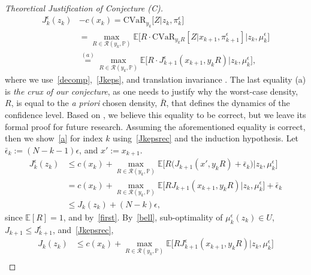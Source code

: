 \documentclass[letterpaper, 10 pt, conference]{ieeeconf}  %
\begin{document}
\begin{proof}[Theoretical Justification of Conjecture (C)]
%
\begin{equation*}\begin{aligned}
J_k^\epsilon(z_k)& - c(x_k) = \text{CVaR}_{y_k}\big[ Z \big| z_k, \pi_k^\epsilon \big]\\
& = {\underset{R \in \mathcal{R}(y_k, \mathbb{P})}\max}\mathbb{E}\big[ R\cdot \text{CVaR}_{y_k R}[ Z | x_{k+1}, \pi^\epsilon_{k+1} ] \big| z_k, \mu_k^\epsilon \big] \\
& {\overset{(a)}{=}} {\underset{R \in \mathcal{R}(y_k, \mathbb{P})}\max}\mathbb{E}\big[ R\cdot J_{k+1}^\epsilon(x_{k+1},y_k R) \big| z_k, \mu_k^\epsilon \big],
\end{aligned}\end{equation*}
%
where we use~\eqref{decomp},~\eqref{Jkeps}, and translation invariance\footnotemark 
{}. 
The last equality (a) is {\em the crux of our conjecture}, 
as one needs to justify why the worst-case density, $R$, is equal to the \textit{a priori} chosen density, $\bar{R}$, that defines the dynamics of the confidence level. 
Based on \cite{chow2015risk}, we believe this equality to be correct, but we leave its formal proof for future research. 
Assuming the aforementioned equality is correct, then we show~\eqref{a} for index $k$ using~\eqref{Jkepsrec} and the induction hypothesis. 
Let $\bar{\epsilon}_k := (N-k-1)\epsilon$, and $x' := x_{k+1}$.
%
\begin{equation*}\begin{aligned}
J_k^\epsilon(z_k) & \leq c(x_k) + {\underset{R \in \mathcal{R}(y_k, \mathbb{P})}\max} \mathbb{E}\big[ R\big(J_{k+1}(x',y_k R) + \bar{\epsilon}_k\big) \big| z_k, \mu_k^\epsilon \big]\\
& = c(x_k) + {\underset{R \in \mathcal{R}(y_k, \mathbb{P})}\max} \mathbb{E}\big[ R J_{k+1}(x_{k+1},y_k R) \big| z_k, \mu_k^\epsilon \big] + \bar{\epsilon}_k\\ 
& \leq J_k(z_k) + (N-k)\epsilon,
\end{aligned}\end{equation*}
%
since $\mathbb{E}[R] = 1$, and by~\eqref{first}. By~\eqref{bell}, sub-optimality of $\mu_k^\epsilon(z_k) \in U$, $J_{k+1} \leq J^\epsilon_{k+1}$, and~\eqref{Jkepsrec},
%
\begin{equation*}\begin{aligned}
J_k(z_k) & \leq c(x_k) + {\underset{R \in \mathcal{R}(y_k, \mathbb{P})}\max} \mathbb{E}\big[ R J^\epsilon_{k+1}(x_{k+1},y_k R) \big| z_k, \mu_k^\epsilon \big]\\

\end{aligned}
\end{equation*}
\end{proof}
\end{document}
